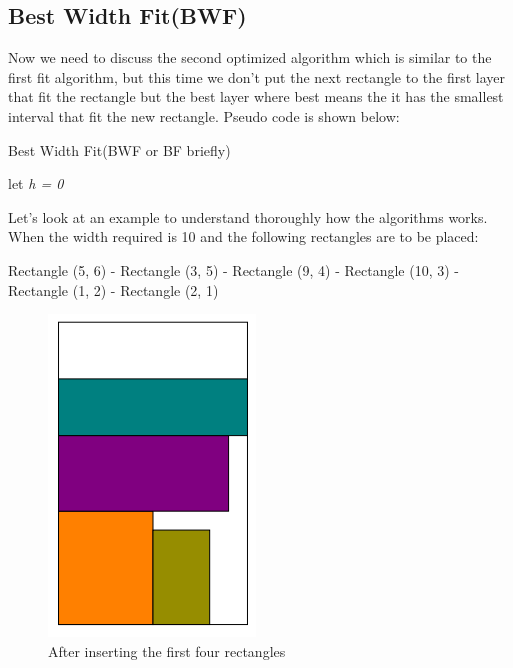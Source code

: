 \documentclass[12pt]{article}
\begin{document}
    \subsection{Best Width Fit(BWF)}
    Now we need to discuss the second optimized algorithm which is 
    similar to the first fit algorithm, but this time we don't put 
    the next rectangle to the first layer that fit the rectangle but the best 
    layer where best means the it has the smallest interval that 
    fit the new rectangle. Pseudo code is shown below:
    \begin{algorithm}
        \caption{Best Width Fit(BWF or BF briefly)}
        \LinesNumbered
        let \emph{h = 0}\;
    \end{algorithm}

    Let’s look at an example to understand thoroughly how the algorithms works. When the width
    required is 10 and the following rectangles are to be placed: 

    Rectangle (5, 6) - Rectangle (3, 5) - Rectangle (9, 4) - Rectangle (10, 3) - Rectangle (1, 2) -
    Rectangle (2, 1)

    \begin{figure}[h]
        \centering
        \includegraphics[scale=0.4]{1.png}
        \caption{After inserting the first four rectangles}
    \end{figure}
\end{document}

